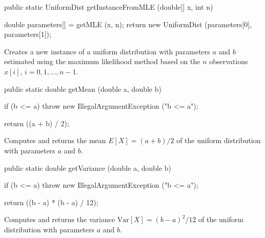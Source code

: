 \begin{htmlonly}
\end{htmlonly}
\begin{code}

   public static UniformDist getInstanceFromMLE (double[] x, int n)\begin{hide} {
      double parameters[] = getMLE (x, n);
      return new UniformDist (parameters[0], parameters[1]);
   }\end{hide}
\end{code}
\begin{tabb}
   Creates a new instance of a uniform distribution with parameters $a$ and $b$
   estimated using the maximum likelihood method based on the $n$ observations
   $x[i]$, $i = 0, 1, \ldots, n-1$.
\end{tabb}
\begin{htmlonly}
\end{htmlonly}
\begin{code}

   public static double getMean (double a, double b)\begin{hide} {
      if (b <= a)
         throw new IllegalArgumentException ("b <= a");

      return ((a + b) / 2);
   }\end{hide}
\end{code}
\begin{tabb}  Computes and returns the mean $E[X] = (a + b)/2$
   of the uniform distribution with parameters $a$ and $b$.
\end{tabb}
\begin{htmlonly}
\end{htmlonly}
\begin{code}

   public static double getVariance (double a, double b)\begin{hide} {
      if (b <= a)
         throw new IllegalArgumentException ("b <= a");

      return ((b - a) * (b - a) / 12);
   }\end{hide}
\end{code}
\begin{tabb}  Computes and returns the variance $\mbox{Var}[X] = (b - a)^2/12$
   of the uniform distribution with parameters $a$ and $b$.
\end{tabb}
